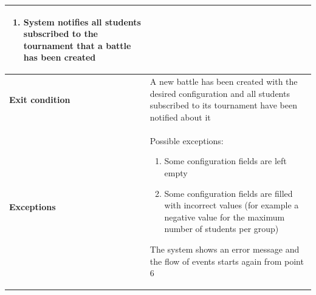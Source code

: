\documentclass[../RASD.tex]{subfiles}
\begin{document}
\begin{table}[H]
\begin{center}
\begin{tabular}{|m{10em}|m{30em}|}
\begin{enumerate}
                        \item System notifies all students subscribed to the tournament that a battle has been created
                    \end{enumerate}\\
                \hline
                \textbf{Exit condition} & A new battle has been created with the desired configuration and all students subscribed to its tournament have been notified about it\\
                \hline
                \textbf{Exceptions} & 
                    Possible exceptions:
                    \begin{enumerate}
                        \item Some configuration fields are left empty
                        \item Some configuration fields are filled with incorrect values (for example a negative value for the maximum number of students per group)
                    \end{enumerate}
                    The system shows an error message and the flow of events starts again from point 6\\
                \hline
                \end{tabular}
            \end{center}
        \end{table}\newpage
\end{document}
